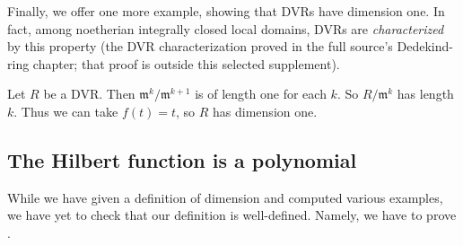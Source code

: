 Finally, we offer one more example, showing that DVRs have dimension one. In
fact, among noetherian integrally closed local domains, DVRs are
\emph{characterized} by this property (the DVR characterization proved in the full source's Dedekind-ring chapter; that proof is outside this selected supplement).

\begin{example}
Let $R$ be a DVR. Then $\mathfrak{m}^k/\mathfrak{m}^{k+1}$ is of length one for
each $k$. So $R/\mathfrak{m}^k$ has length $k$. Thus we can take $f(t) = t$, so
$R$ has dimension one.
\end{example} 

\subsection{The Hilbert function is a polynomial} 

While we have given a definition of dimension and computed various examples,
we have yet to check that our definition is well-defined. 
Namely, we have to prove .

